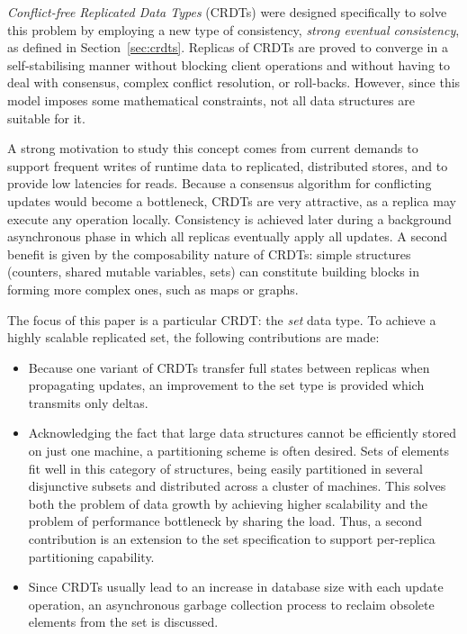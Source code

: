 \textit{Conflict-free Replicated Data Types} (CRDTs) were designed specifically
to solve this problem by employing a new type of consistency, \textit{strong
eventual consistency}, as defined in Section~\ref{sec:crdts}. Replicas of CRDTs
are proved to converge in a self-stabilising manner without blocking client
operations and without having to deal with consensus, complex conflict
resolution, or roll-backs. However, since this model imposes some mathematical
constraints, not all data structures are suitable for it.

A strong motivation to study this concept comes from current demands to support
frequent writes of runtime data to replicated, distributed stores, and to
provide low latencies for reads. Because a consensus algorithm for conflicting
updates would become a bottleneck, CRDTs are very attractive, as a replica may
execute any operation locally. Consistency is achieved later during a
background asynchronous phase in which all replicas eventually apply all
updates. A second benefit is given by the composability nature of CRDTs: simple
structures (counters, shared mutable variables, sets) can constitute building
blocks in forming more complex ones, such as maps or graphs.

The focus of this paper is a particular CRDT: the \textit{set} data type. To
achieve a highly scalable replicated set, the following contributions are made:
\begin{itemize}
  \item Because one variant of CRDTs transfer full states between replicas when
  propagating updates, an improvement to the set type is provided which
  transmits only deltas.
  \item Acknowledging the fact that large data structures cannot be efficiently
  stored on just one machine, a partitioning scheme is often desired. Sets of
  elements fit well in this category of structures, being easily partitioned in
  several disjunctive subsets and distributed across a cluster of machines.
  This solves both the problem of data growth by achieving higher scalability
  and the problem of performance bottleneck by sharing the load. Thus, a second
  contribution is an extension to the set specification to support per-replica
  partitioning capability.
  \item Since CRDTs usually lead to an increase in database size with each
  update operation, an asynchronous garbage collection process to reclaim
  obsolete elements from the set is discussed.
\end{itemize}